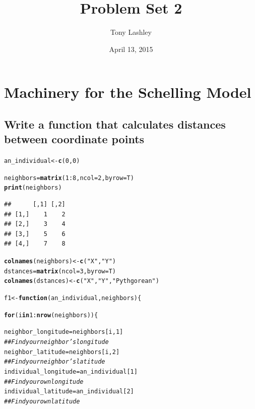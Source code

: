 \documentclass{article}\usepackage[]{graphicx}\usepackage[]{color}
\title{Problem Set 2}
\author{Tony Lashley}
\date{April 13, 2015}
\makeatletter
\newcommand{\hlnum}[1]{\textcolor[rgb]{0.686,0.059,0.569}{#1}}%
\newcommand{\hlstr}[1]{\textcolor[rgb]{0.192,0.494,0.8}{#1}}%
\newcommand{\hlcom}[1]{\textcolor[rgb]{0.678,0.584,0.686}{\textit{#1}}}%
\newcommand{\hlopt}[1]{\textcolor[rgb]{0,0,0}{#1}}%
\newcommand{\hlstd}[1]{\textcolor[rgb]{0.345,0.345,0.345}{#1}}%
\newcommand{\hlkwa}[1]{\textcolor[rgb]{0.161,0.373,0.58}{\textbf{#1}}}%
\newcommand{\hlkwb}[1]{\textcolor[rgb]{0.69,0.353,0.396}{#1}}%
\newcommand{\hlkwc}[1]{\textcolor[rgb]{0.333,0.667,0.333}{#1}}%
\newcommand{\hlkwd}[1]{\textcolor[rgb]{0.737,0.353,0.396}{\textbf{#1}}}%
\newenvironment{kframe}{%
 \def\at@end@of@kframe{}%
 \ifinner\ifhmode%
  \def\at@end@of@kframe{\end{minipage}}%
  \begin{minipage}{\columnwidth}%
 \fi\fi%
 \def\FrameCommand##1{\hskip\@totalleftmargin \hskip-\fboxsep
 \colorbox{shadecolor}{##1}\hskip-\fboxsep
     \hskip-\linewidth \hskip-\@totalleftmargin \hskip\columnwidth}%
 \MakeFramed {\advance\hsize-\width
   \@totalleftmargin\z@ \linewidth\hsize
   \@setminipage}}%
 {\par\unskip\endMakeFramed%
 \at@end@of@kframe}
\newenvironment{knitrout}{}{} %
\makeatother
\begin{document}
\maketitle

\section{Machinery for the Schelling Model}
\subsection{Write a function that calculates distances between coordinate points}
\begin{knitrout}
\color{fgcolor}\begin{kframe}
\begin{alltt}
\hlstd{an_individual} \hlkwb{<-} \hlkwd{c}\hlstd{(}\hlnum{0}\hlstd{,}\hlnum{0}\hlstd{)}

\hlstd{neighbors} \hlkwb{=} \hlkwd{matrix}\hlstd{(}\hlnum{1}\hlopt{:}\hlnum{8}\hlstd{,} \hlkwc{ncol} \hlstd{=} \hlnum{2}\hlstd{,} \hlkwc{byrow} \hlstd{= T)}
\hlkwd{print}\hlstd{(neighbors)}
\end{alltt}
\begin{verbatim}
##      [,1] [,2]
## [1,]    1    2
## [2,]    3    4
## [3,]    5    6
## [4,]    7    8
\end{verbatim}
\begin{alltt}
\hlkwd{colnames}\hlstd{(neighbors)} \hlkwb{<-} \hlkwd{c}\hlstd{(}\hlstr{"X"}\hlstd{,}\hlstr{"Y"}\hlstd{)}
\hlstd{dstances} \hlkwb{=} \hlkwd{matrix}\hlstd{(}\hlkwc{ncol} \hlstd{=} \hlnum{3}\hlstd{,} \hlkwc{byrow} \hlstd{= T)}
\hlkwd{colnames}\hlstd{(dstances)} \hlkwb{<-} \hlkwd{c}\hlstd{(}\hlstr{"X"}\hlstd{,}\hlstr{"Y"}\hlstd{,} \hlstr{"Pythgorean"}\hlstd{)}

\hlstd{f1} \hlkwb{<-} \hlkwa{function}\hlstd{(}\hlkwc{an_individual}\hlstd{,} \hlkwc{neighbors}\hlstd{)\{}

  \hlkwa{for} \hlstd{(i} \hlkwa{in} \hlnum{1}\hlopt{:}\hlkwd{nrow}\hlstd{(neighbors))\{}

    \hlstd{neighbor_longitude} \hlkwb{=} \hlstd{neighbors[i,}\hlnum{1}\hlstd{]}
    \hlcom{## Find your neighbor's longitude}
    \hlstd{neighbor_latitude} \hlkwb{=}  \hlstd{neighbors[i,}\hlnum{2}\hlstd{]}
    \hlcom{## Find your neighbor's latitude}
    \hlstd{individual_longitude} \hlkwb{=} \hlstd{an_individual[}\hlnum{1}\hlstd{]}
    \hlcom{## Find your own longitude}
    \hlstd{individual_latitude} \hlkwb{=}  \hlstd{an_individual[}\hlnum{2}\hlstd{]}
    \hlcom{## Find your own latitude}


\end{alltt}
\end{kframe}
\end{knitrout}
\end{document}

